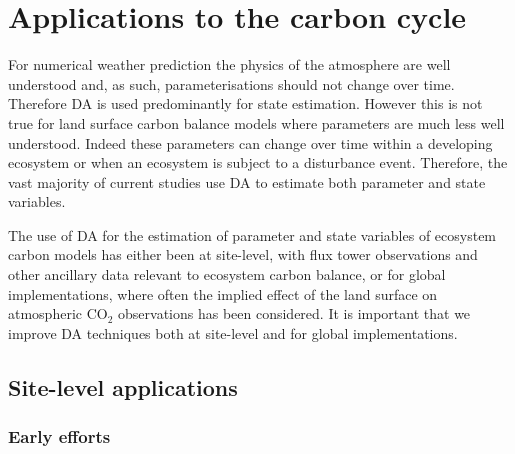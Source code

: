 \section{Applications to the carbon cycle}

For numerical weather prediction the physics of the atmosphere are well understood and, as such, parameterisations should not change over time. Therefore DA is used predominantly for state estimation. However this is not true for land surface carbon balance models where parameters are much less well understood. Indeed these parameters can change over time within a developing ecosystem or when an ecosystem is subject to a disturbance event. Therefore, the vast majority of current studies use DA to estimate both parameter and state variables.

The use of DA for the estimation of parameter and state variables of ecosystem carbon models has either been at site-level, with flux tower observations and other ancillary data relevant to ecosystem carbon balance, or for global implementations, where often the implied effect of the land surface on atmospheric CO\(_{2}\) observations has been considered. It is important that we improve DA techniques both at site-level and for global implementations.   

\subsection{Site-level applications}


\subsubsection{Early efforts}

